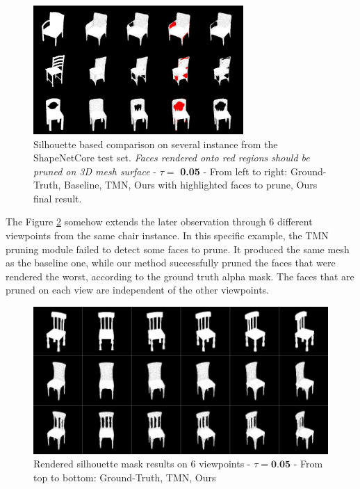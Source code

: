 \begin{figure}[htb]%
\begin{center}
\includegraphics[width=8cm]{images/adaptativesr/highlight_faces.png}
\end{center}
    \caption{Silhouette based comparison on several instance from the ShapeNetCore test set. \textit{Faces rendered onto red regions should be pruned on 3D mesh surface} - $\tau = $ \textbf{0.05} - From left to right: Ground-Truth, Baseline, TMN\citep{pan2019deep}, Ours with highlighted faces to prune, Ours final result.}
\label{fig:face2prune}
\end{figure}

The Figure \ref{fig:pruning_multi_view} somehow extends the later observation through 6 different viewpoints from the same chair instance. In this specific example, the TMN pruning module failed to detect some faces to prune. It produced the same mesh as the baseline one, while our method successfully pruned the faces that were rendered the worst, according to the ground truth alpha mask. The faces that are pruned on each view are independent of the other viewpoints. 

\begin{figure}[h!]%
\begin{center}
\includegraphics[width=8.cm]{images/adaptativesr/severalview2D.png}
\end{center}
    \caption{Rendered silhouette mask results on 6 viewpoints - $\tau =\textbf{0.05}$ - From top to bottom: Ground-Truth, TMN\citep{pan2019deep},  Ours}
\label{fig:pruning_multi_view}
\end{figure}

